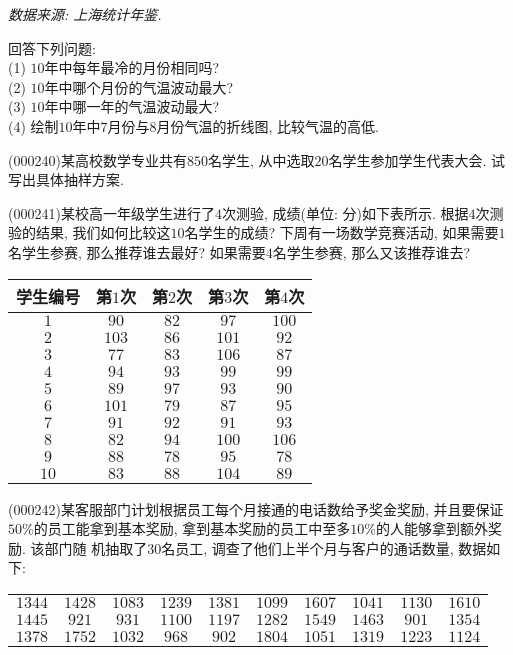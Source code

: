 \begin{flushright}
{\it 数据来源: 上海统计年鉴.}
\end{flushright}
回答下列问题:\\
(1) $10$年中每年最冷的月份相同吗?\\
(2) $10$年中哪个月份的气温波动最大?\\
(3) $10$年中哪一年的气温波动最大?\\
(4) 绘制$10$年中$7$月份与$8$月份气温的折线图, 比较气温的高低.
\item (000240)某高校数学专业共有$850$名学生, 从中选取$20$名学生参加学生代表大会. 试写出具体抽样方案.
\item (000241)某校高一年级学生进行了$4$次测验, 成绩(单位: 分)如下表所示. 根据$4$次测验的结果, 我们如何比较这$10$名学生的成绩? 下周有一场数学竞赛活动, 如果需要$1$名学生参赛, 那么推荐谁去最好? 如果需要$4$名学生参赛, 那么又该推荐谁去?
\begin{center}
    \begin{tabular}{|c|c|c|c|c|}
        \hline
        学生编号 & 第$1$次 & 第$2$次 & 第$3$次 & 第$4$次 \\ \hline
        $1$ & $90$ & $82$ & $97$ & $100$ \\ \hline
        $2$ & $103$ & $86$ & $101$ & $92$ \\ \hline
        $3$ & $77$ & $83$ & $106$ & $87$ \\ \hline
        $4$ & $94$ & $93$ & $99$ & $99$ \\ \hline 
        $5$ & $89$ & $97$ & $93$ & $90$\\ \hline
        $6$ & $101$ & $79$ & $87$ & $95$\\ \hline
        $7$ & $91$ & $92$ & $91$ & $93$ \\ \hline
        $8$ & $82$ & $94$ & $100$ & $106$ \\ \hline
        $9$ & $88$ & $78$ & $95$ & $78$ \\ \hline
        $10$ & $83$ & $88$ & $104$ & $89$ \\ \hline        
    \end{tabular}
\end{center}
\item (000242)某客服部门计划根据员工每个月接通的电话数给予奖金奖励, 并且要保证$50\%$的员工能拿到基本奖励, 拿到基本奖励的员工中至多$10\%$的人能够拿到额外奖励. 该部门随
机抽取了$30$名员工, 调查了他们上半个月与客户的通话数量, 数据如下:
\begin{center}
    \begin{tabular}{cccccccccc}
        $1344$ & $1428$ & $1083$ & $1239$ & $1381$ & $1099$ & $1607$ & $1041$ & $1130$ & $1610$ \\
        $1445$ & $921$ & $931$ & $1100$ & $1197$ & $1282$ & $1549$ & $1463$ & $901$ & $1354$ \\
        $1378$ & $1752$ & $1032$ & $968$ & $902$ & $1804$ & $1051$ & $1319$ & $1223$ & $1124$
    \end{tabular}
\end{center}
